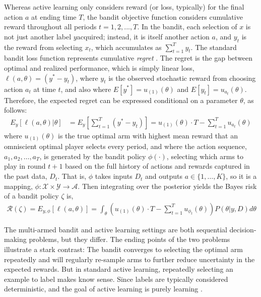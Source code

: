 \documentclass[blindrev,mnsc]{informs3}
\newcommand{\numitems}{K}
\newcommand{\risk}{\mathcal{R}}
\begin{document}
Whereas active learning only considers reward (or loss, typically) for the final action $a$ at ending time $T$, the bandit objective function considers cumulative reward throughout all periods $t=1,2,...,T$. In the bandit, each selection of $x$ is not just another label $y$acquired; instead, it is itself another action $a$, and $y_t$ is the reward from selecting $x_t$, which accumulates as $\sum_{t=1}^{T} y_t$. The standard bandit loss function represents cumulative \emph{regret} \citep{Auer2002,LaiRobbins1985}. The regret is the gap between optimal and realized performance, which is simply linear loss, $\ell(a,\theta) = (y^{*} - y_t)$, where $y_t$ is the observed stochastic reward from choosing action $a_t$ at time $t$, and also where $E[y^{*}] = u_{(1)}(\theta)$ and $E[y_t] = u_{a_t}(\theta)$. Therefore, the expected regret can be expressed conditional on a parameter $\theta$, as follows:
\begin{align}
E_{y}\left[ \ell(a,\theta) | \theta \right] &= E_{y}\left[ \sum_{t=1}^{T} (y^{*} - y_t) \right] = u_{(1)}(\theta) \cdot T - \sum_{t=1}^{T} u_{a_t}(\theta) 
\end{align}
where $u_{(1)}(\theta)$ is the true optimal arm with highest mean reward that an omniscient optimal player selects every period, and where the action sequence, $a_1,a_2,\ldots,a_T$, is generated by the bandit policy $\phi(\cdot)$, selecting which arms to play in round $t+1$ based on the full history of actions and rewards captured in the past data, $D_t$. That is, $\phi$ takes inputs $D_{t}$ and outputs $a \in \{1,\ldots,\numitems\}$, so it is a mapping, $\phi: \mathcal{X} \times \mathcal{Y} \to \mathcal{A}$. Then integrating over the posterior yields the Bayes risk of a bandit policy $\zeta$ is,
\begin{align}
\risk(\zeta) = E_{y,\phi}\left[ \ell(a,\theta) \right] = 
\int_{\theta} \left(  u_{(1)}(\theta) \cdot T - \sum_{t=1}^{T} u_{\phi_t}(\theta) \right) P(\theta|y,D)  d\theta
\end{align}

The multi-armed bandit and active learning settings are both sequential decision-making problems, but they differ. The ending points of the two problems illustrate a stark contrast: The bandit converges to selecting the optimal arm repeatedly and will regularly re-sample arms to further reduce uncertainty in the expected rewards. But in standard active learning, repeatedly selecting an example to label makes know sense. Since labels are typically considered deterministic, and the goal of active learning is purely learning \citep{gantigray2013bridgealmab}. 
\end{document}
